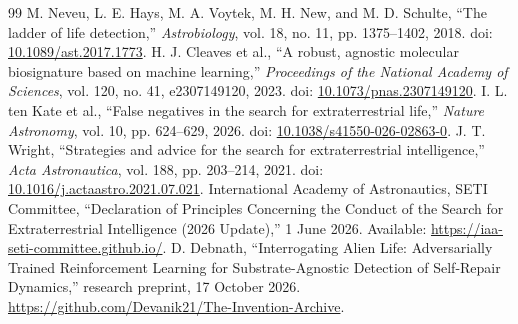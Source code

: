 \documentclass[11pt]{article}
\begin{document}
\begin{thebibliography}{99}
 M. Neveu, L. E. Hays, M. A. Voytek, M. H. New, and M. D. Schulte, ``The ladder of life detection,'' \emph{Astrobiology}, vol. 18, no. 11, pp. 1375--1402, 2018. doi: \href{https://doi.org/10.1089/ast.2017.1773}{10.1089/ast.2017.1773}.
 H. J. Cleaves et al., ``A robust, agnostic molecular biosignature based on machine learning,'' \emph{Proceedings of the National Academy of Sciences}, vol. 120, no. 41, e2307149120, 2023. doi: \href{https://doi.org/10.1073/pnas.2307149120}{10.1073/pnas.2307149120}.
 I. L. ten Kate et al., ``False negatives in the search for extraterrestrial life,'' \emph{Nature Astronomy}, vol. 10, pp. 624--629, 2026. doi: \href{https://doi.org/10.1038/s41550-026-02863-0}{10.1038/s41550-026-02863-0}.
 J. T. Wright, ``Strategies and advice for the search for extraterrestrial intelligence,'' \emph{Acta Astronautica}, vol. 188, pp. 203--214, 2021. doi: \href{https://doi.org/10.1016/j.actaastro.2021.07.021}{10.1016/j.actaastro.2021.07.021}.
 International Academy of Astronautics, SETI Committee, ``Declaration of Principles Concerning the Conduct of the Search for Extraterrestrial Intelligence (2026 Update),'' 1 June 2026. Available: \url{https://iaa-seti-committee.github.io/}.
 D. Debnath, ``Interrogating Alien Life: Adversarially Trained Reinforcement Learning for Substrate-Agnostic Detection of Self-Repair Dynamics,'' research preprint, 17 October 2026. \url{https://github.com/Devanik21/The-Invention-Archive}.
\end{thebibliography}
\end{document}
